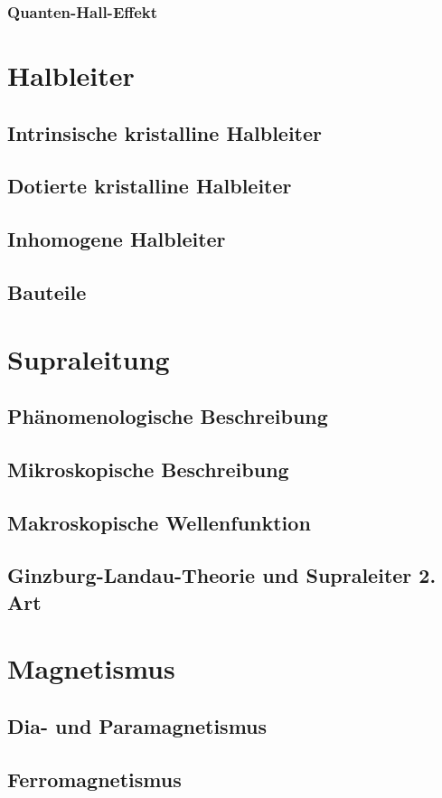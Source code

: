 \documentclass[a4paper,12pt]{article}
\begin{document}
\subsubsection{Quanten-Hall-Effekt}
\section{Halbleiter}
\subsection{Intrinsische kristalline Halbleiter}
\subsection{Dotierte kristalline Halbleiter}
\subsection{Inhomogene Halbleiter}
\subsection{Bauteile}
\section{Supraleitung}
\subsection{Phänomenologische Beschreibung}
\subsection{Mikroskopische Beschreibung}
\subsection{Makroskopische Wellenfunktion}
\subsection{Ginzburg-Landau-Theorie und Supraleiter 2. Art}
\section{Magnetismus}
\subsection{Dia- und Paramagnetismus}
\subsection{Ferromagnetismus}
\end{document}
